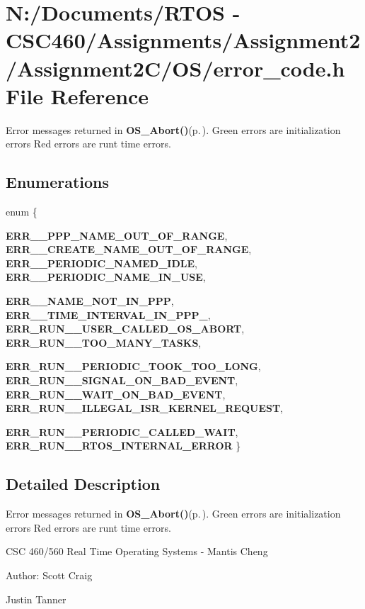 \section{N:/Documents/RTOS - CSC460/Assignments/Assignment2/Assignment2C/OS/error\_\-code.h File Reference}
\label{error__code_8h}
Error messages returned in {\bf OS\_\-Abort()}{\rm (p.\,\pageref{os_8c_b5747390a8be675282cb93e5198bd085})}. Green errors are initialization errors Red errors are runt time errors. 

\subsection*{Enumerations}
\begin{CompactItemize}
\item 
enum \{ \par
{\bf ERR\_\_\-PPP\_\-NAME\_\-OUT\_\-OF\_\-RANGE}, 
{\bf ERR\_\_\-CREATE\_\-NAME\_\-OUT\_\-OF\_\-RANGE}, 
{\bf ERR\_\_\-PERIODIC\_\-NAMED\_\-IDLE}, 
{\bf ERR\_\_\-PERIODIC\_\-NAME\_\-IN\_\-USE}, 
\par
{\bf ERR\_\_\-NAME\_\-NOT\_\-IN\_\-PPP}, 
{\bf ERR\_\_\-TIME\_\-INTERVAL\_\-IN\_\-PPP\_}, 
{\bf ERR\_\-RUN\_\_\-USER\_\-CALLED\_\-OS\_\-ABORT}, 
{\bf ERR\_\-RUN\_\_\-TOO\_\-MANY\_\-TASKS}, 
\par
{\bf ERR\_\-RUN\_\_\-PERIODIC\_\-TOOK\_\-TOO\_\-LONG}, 
{\bf ERR\_\-RUN\_\_\-SIGNAL\_\-ON\_\-BAD\_\-EVENT}, 
{\bf ERR\_\-RUN\_\_\-WAIT\_\-ON\_\-BAD\_\-EVENT}, 
{\bf ERR\_\-RUN\_\_\-ILLEGAL\_\-ISR\_\-KERNEL\_\-REQUEST}, 
\par
{\bf ERR\_\-RUN\_\_\-PERIODIC\_\-CALLED\_\-WAIT}, 
{\bf ERR\_\-RUN\_\_\-RTOS\_\-INTERNAL\_\-ERROR}
 \}
\end{CompactItemize}


\subsection{Detailed Description}
Error messages returned in {\bf OS\_\-Abort()}{\rm (p.\,\pageref{os_8c_b5747390a8be675282cb93e5198bd085})}. Green errors are initialization errors Red errors are runt time errors. 

CSC 460/560 Real Time Operating Systems - Mantis Cheng

\begin{Desc}
\item[Author:]Scott Craig 

Justin Tanner \end{Desc}


